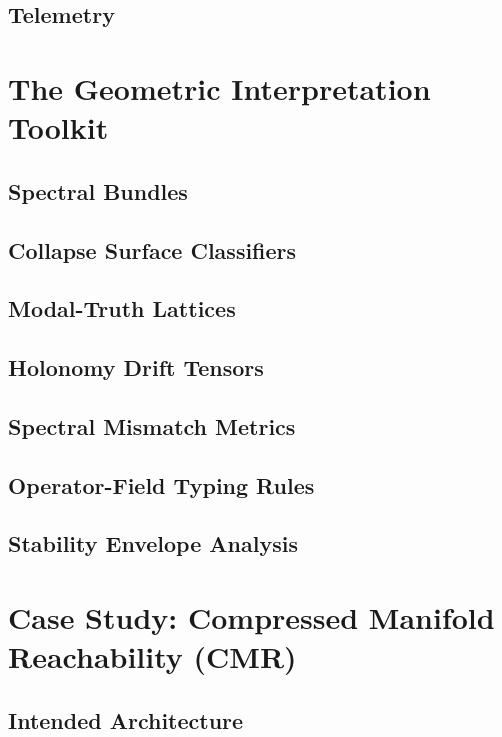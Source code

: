 \subsection{Telemetry}

\section{The Geometric Interpretation Toolkit}
\subsection{Spectral Bundles}
\subsection{Collapse Surface Classifiers}
\subsection{Modal-Truth Lattices}
\subsection{Holonomy Drift Tensors}
\subsection{Spectral Mismatch Metrics}
\subsection{Operator-Field Typing Rules}
\subsection{Stability Envelope Analysis}

\section{Case Study: Compressed Manifold Reachability (CMR)}
\subsection{Intended Architecture}

